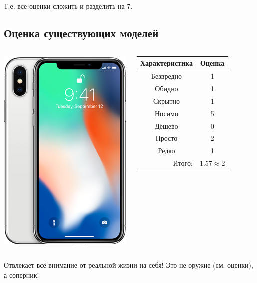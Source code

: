 Т.е. все оценки сложить и разделить на 7.

\subsection{Оценка существующих моделей}

\begin{frame}  %
    \begin{columns}
            \begin{center}
                \includegraphics[height=.8\textheight]{fig/iphoneX}
            \end{center}
            
            \begin{center}
                \begin{tabular}{c|c}
                    \hline\hline
                    Характеристика              & Оценка\\ \hline\hline
                    Безвредно                   & 1 \\
                    Обидно                      & 1 \\
                    Скрытно                     & 1 \\
                    Носимо                      & 5 \\
                    Дёшево                      & 0 \\
                    Просто                      & 2 \\ 
                    Редко                       & 1 \\ \hline
                    \multicolumn{1}{r|}{Итого:} & $1.57\approx 2$ \\
                \end{tabular}
            \end{center}
    \end{columns}    
    
    Отвлекает \alert{всё} внимание от \alert{реальной жизни} на себя! Это \alert{не оружие} (см. оценки), а \alert{соперник}!
\end{frame}

